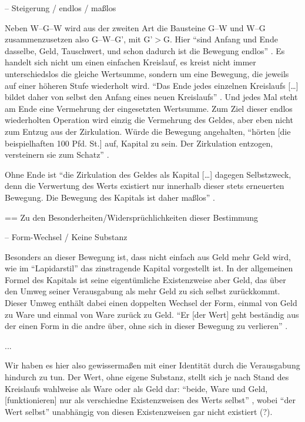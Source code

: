 \documentclass[12pt,
               DIV13,
               paper=a4,
               twoside=false,
               onehalfspacing,
               bibliography=totoc,
               toc=graduated,
               draft,
               ]{scrartcl}
\newcommand{\lips}{\dots\unkern}
\newcommand{\pc}[2]{\parencite[#1]{#2}}
\newcommand{\gwg}{G--W--G'\xspace}
\newcommand{\wgw}{W--G--W\xspace}
\begin{document}
-- Steigerung / endlos / maßlos

Neben \wgw wird aus der zweiten Art die Bausteine G--W und W--G
zusammenzusetzen also \gwg, mit G'$>$G. Hier "`sind Anfang und Ende
dasselbe, Geld, Tauschwert, und schon dadurch ist die Bewegung
endlos"' \pc{166}{kap}. Es handelt sich nicht um
einen einfachen Kreislauf, es kreist nicht immer unterschiedslos die
gleiche Wertsumme, sondern um eine Bewegung, die jeweils auf
einer höheren Stufe wiederholt wird. "`Das Ende jedes einzelnen Kreislaufs [\lips]
bildet daher von selbst den Anfang eines neuen Kreislaufs"' \pc{S. 166
f.}{kap}. Und jedes Mal steht am Ende eine Vermehrung der
eingesetzten Wertsumme. Zum Ziel dieser endlos wiederholten Operation
wird einzig die Vermehrung des Geldes, aber eben nicht zum Entzug aus
der Zirkulation. Würde die Bewegung angehalten, "`hörten [die
beispielhaften 100 Pfd. St.] auf, Kapital zu sein. Der Zirkulation
entzogen, versteinern sie zum Schatz"' \pc{166}{kap}.

Ohne Ende ist "`die Zirkulation des Geldes als Kapital [\lips] dagegen
Selbstzweck, denn die Verwertung des Werts existiert nur innerhalb
dieser stets erneuerten Bewegung. Die Bewegung des Kapitals ist daher
maßlos"' \pc{167}{kap}.


== Zu den Besonderheiten/Widersprüchlichkeiten dieser Bestimmung

-- Form-Wechsel / Keine Substanz

Besonders an dieser Bewegung ist, dass nicht einfach aus Geld mehr
Geld wird, wie im "`Lapidarstil"' \pc{170}{kap} das zinstragende
Kapital vorgestellt ist. In der allgemeinen Formel des Kapitals ist
seine eigentümliche Existenzweise aber Geld, das über den Umweg seiner
Verausgabung als mehr Geld zu sich selbst zurückkommt.
Dieser Umweg enthält dabei einen doppelten Wechsel der Form, einmal
von Geld zu Ware und einmal von Ware zurück zu Geld. "`Er [der Wert]
geht beständig aus der einen Form in die andre über, ohne sich in
dieser Bewegung zu verlieren"' \pc{S. 168 f.}{kap}.

...

Wir haben es hier also gewissermaßen mit einer Identität durch die
Verausgabung hindurch zu tun. Der Wert, ohne eigene Substanz, stellt
sich je nach Stand des Kreislaufs wahlweise als Ware oder als Geld
dar: "`beide, Ware und Geld, [funktionieren] nur als verschiedne
Existenzweisen des Werts selbst"' \pc{168}{kap}, wobei "`der Wert
selbst"' unabhängig von diesen Existenzweisen gar nicht existiert (?).
\end{document}
